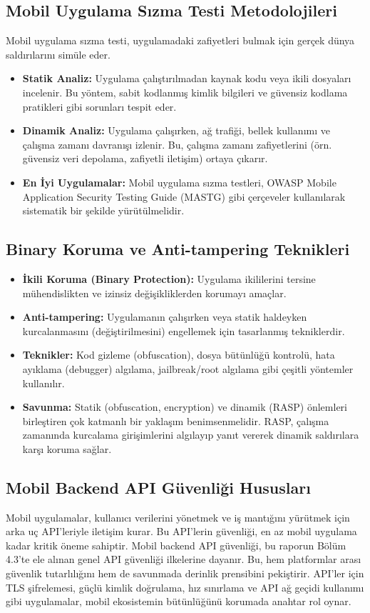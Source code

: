 \subsection{Mobil Uygulama Sızma Testi Metodolojileri}

Mobil uygulama sızma testi, uygulamadaki zafiyetleri bulmak için gerçek dünya saldırılarını simüle eder.

\begin{itemize}
\item \textbf{Statik Analiz:} Uygulama çalıştırılmadan kaynak kodu veya ikili dosyaları incelenir. Bu yöntem, sabit kodlanmış kimlik bilgileri ve güvensiz kodlama pratikleri gibi sorunları tespit eder.
\item \textbf{Dinamik Analiz:} Uygulama çalışırken, ağ trafiği, bellek kullanımı ve çalışma zamanı davranışı izlenir. Bu, çalışma zamanı zafiyetlerini (örn. güvensiz veri depolama, zafiyetli iletişim) ortaya çıkarır.
\item \textbf{En İyi Uygulamalar:} Mobil uygulama sızma testleri, OWASP Mobile Application Security Testing Guide (MASTG) gibi çerçeveler kullanılarak sistematik bir şekilde yürütülmelidir.
\end{itemize}
\subsection{Binary Koruma ve Anti-tampering Teknikleri}
\begin{itemize}
\item \textbf{İkili Koruma (Binary Protection):} Uygulama ikililerini tersine mühendislikten ve izinsiz değişikliklerden korumayı amaçlar.
\item \textbf{Anti-tampering:} Uygulamanın çalışırken veya statik haldeyken kurcalanmasını (değiştirilmesini) engellemek için tasarlanmış tekniklerdir.
\item \textbf{Teknikler:} Kod gizleme (obfuscation), dosya bütünlüğü kontrolü, hata ayıklama (debugger) algılama, jailbreak/root algılama gibi çeşitli yöntemler kullanılır.
\item \textbf{Savunma:} Statik (obfuscation, encryption) ve dinamik (RASP) önlemleri birleştiren çok katmanlı bir yaklaşım benimsenmelidir. RASP, çalışma zamanında kurcalama girişimlerini algılayıp yanıt vererek dinamik saldırılara karşı koruma sağlar.
\end{itemize}

\subsection{Mobil Backend API Güvenliği Hususları}

Mobil uygulamalar, kullanıcı verilerini yönetmek ve iş mantığını yürütmek için arka uç API'leriyle iletişim kurar. Bu API'lerin güvenliği, en az mobil uygulama kadar kritik öneme sahiptir. Mobil backend API güvenliği, bu raporun Bölüm 4.3'te ele alınan genel API güvenliği ilkelerine dayanır. Bu, hem platformlar arası güvenlik tutarlılığını hem de savunmada derinlik prensibini pekiştirir. API'ler için TLS şifrelemesi, güçlü kimlik doğrulama, hız sınırlama ve API ağ geçidi kullanımı gibi uygulamalar, mobil ekosistemin bütünlüğünü korumada anahtar rol oynar.
